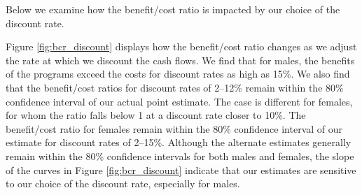 \noindent Below we examine how the benefit/cost ratio is impacted by our choice of the discount rate. 

\noindent Figure \ref{fig:bcr_discount} displays how the benefit/cost ratio changes as we adjust
the rate at which we discount the cash flows. We find that for males, the benefits of 
the programs exceed the costs for discount rates as high as 15\%. We also
find that the benefit/cost ratios for discount rates of 2--12\% remain within the 
80\% confidence interval of our actual point estimate. The case is different for females,
for whom the ratio falls below 1 at a discount rate closer to 10\%. The benefit/cost ratio for 
females remain within the 80\% confidence interval of our estimate for discount rates
of 2--15\%. Although the alternate estimates generally remain within the 80\%
confidence intervals for both males and females, the slope of the curves in Figure
\ref{fig:bcr_discount} indicate that our estimates are sensitive to our choice of
the discount rate, especially for males. 

